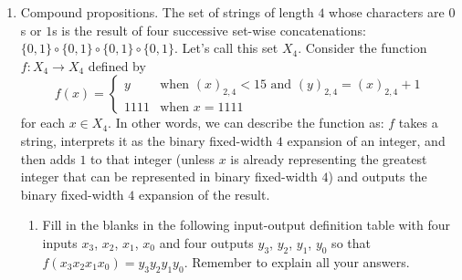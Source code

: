 \documentclass[12pt, oneside]{article}
\begin{document}
\begin{enumerate}[labelindent=0pt, leftmargin=0pt]
    \item Compound propositions. The set of strings of length $4$ whose characters are $0$s or $1$s is
        the result of four successive set-wise concatenations: $\{0,1\} \circ \{0,1\} \circ \{0,1\}\circ \{0,1\}$. Let's call
        this set $X_4$. Consider the function $f: X_4 \to X_4$ defined by
        $$ f(x) = 
        \begin{cases} 
            y &\text{when $(x)_{2,4} < 15$ and $(y)_{2,4} = (x)_{2,4} + 1$}\\
            1111 &\text{when $x = 1111$}
        \end{cases}$$
        for each $x \in X_4$. In other words, we can describe the function as: $f$ takes a string, interprets it as the binary fixed-width $4$
        expansion of an integer, and then adds $1$ to that integer (unless $x$ is already representing
        the greatest integer that can be represented in binary fixed-width $4$) and outputs the binary 
        fixed-width $4$ expansion of the result.
        \begin{enumerate} 
        \item Fill in the blanks in the following input-output definition table 
        with four inputs $x_3$, $x_2$, $x_1$, $x_0$ and four outputs $y_3$, $y_2$, $y_1$, $y_0$
        so that $f(x_3x_2x_1x_0) = y_3y_2y_1y_0$. Remember to explain all your answers.
        

\end{enumerate}
\end{enumerate}
\end{document}
